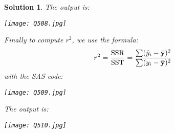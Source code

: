 \documentclass[11pt]{article}
\newtheorem{sol}{Solution}
\begin{document}
\begin{sol}
	The output is:
	\begin{center}
		\texttt{[image: Q508.jpg]}
	\end{center}
	Finally to compute $r^2$, we use the formula:
	\begin{align*}
		r^2 = \frac{\text{SSR}}{\text{SST}} = \frac{\sum(\hat{y}_i - \bar{{\bf y}})^2}{\sum(y_i - \bar{{\bf y}})^2}
	\end{align*}
	with the SAS code:
	\begin{center}
		\texttt{[image: Q509.jpg]}
	\end{center}
	The output is:
	\begin{center}
		\texttt{[image: Q510.jpg]}
	\end{center}
\end{sol}
\end{document}
